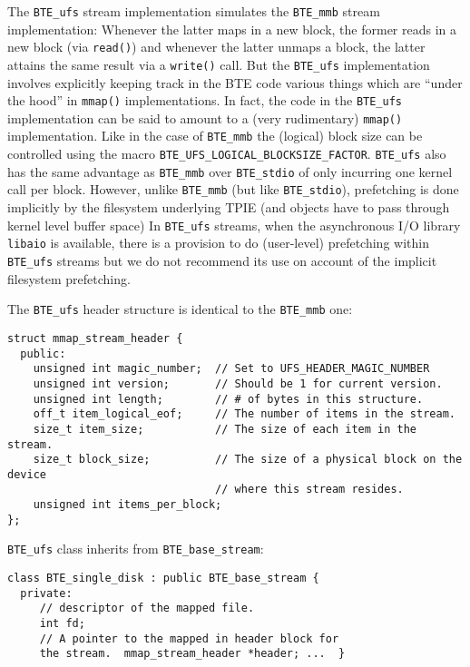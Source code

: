 The \verb|BTE_ufs| stream implementation simulates the \verb|BTE_mmb|
stream implementation: Whenever the latter maps in a new block, the former
reads in a new block (via \verb|read()|) and whenever the latter unmaps a
block, the latter attains the same result via a \verb|write()| call. But
the \verb|BTE_ufs| implementation involves explicitly keeping track in the
BTE code various things which are ``under the hood'' in \verb|mmap()|
implementations. In fact, the code in the
\verb|BTE_ufs| implementation can be said to amount to a (very rudimentary)
\verb|mmap()| implementation. Like in the case of \verb|BTE_mmb| the
(logical) block size can be controlled using the macro
\verb|BTE_UFS_LOGICAL_BLOCKSIZE_FACTOR|. \verb|BTE_ufs| also has the same
advantage as \verb|BTE_mmb| over \verb|BTE_stdio| of only incurring one
kernel call per block. However, unlike \verb|BTE_mmb| (but like
\verb|BTE_stdio|), prefetching is done implicitly by the filesystem
underlying TPIE (and objects have to pass through kernel level buffer
space)
In \verb|BTE_ufs| streams, when the asynchronous I/O library
\verb|libaio| is available,
there is a provision to do (user-level) prefetching within \verb|BTE_ufs|
streams but we do not recommend its use on account of the implicit
filesystem prefetching.

The \verb|BTE_ufs| header structure is identical to the \verb|BTE_mmb| one:
\begin{verbatim}
struct mmap_stream_header { 
  public:
    unsigned int magic_number;  // Set to UFS_HEADER_MAGIC_NUMBER
    unsigned int version;       // Should be 1 for current version.
    unsigned int length;        // # of bytes in this structure.
    off_t item_logical_eof;     // The number of items in the stream.
    size_t item_size;           // The size of each item in the stream.
    size_t block_size;          // The size of a physical block on the device
                                // where this stream resides.
    unsigned int items_per_block;
};
\end{verbatim}

\verb|BTE_ufs| class inherits from \verb|BTE_base_stream|:
\begin{verbatim}
class BTE_single_disk : public BTE_base_stream { 
  private:
     // descriptor of the mapped file.  
     int fd;
     // A pointer to the mapped in header block for
     the stream.  mmap_stream_header *header; ...  }
\end{verbatim}

